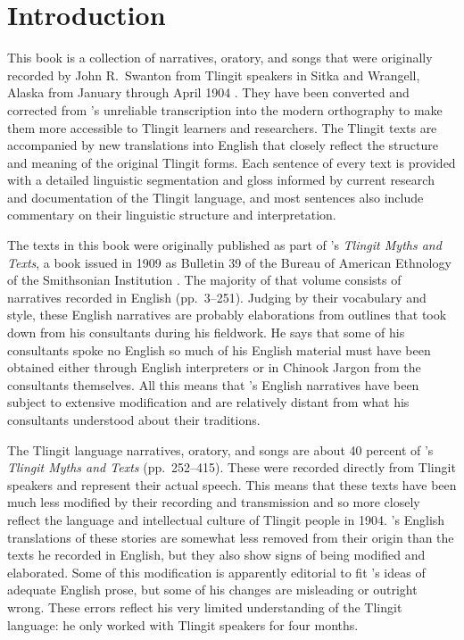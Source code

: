 
\resetexcnt
\chapter{Introduction}\label{ch:introduction}

This book is a collection of narratives, oratory, and songs that were originally recorded by John R.\ Swanton from Tlingit speakers in  Sitka and  Wrangell, Alaska from January through April 1904 \parencite[1]{swanton:1909}.
They have been converted and corrected from \citeauthor{swanton:1909}’s unreliable transcription into the modern orthography to make them more accessible to Tlingit learners and researchers.
The Tlingit texts are accompanied by new translations into English that closely reflect the structure and meaning of the original Tlingit forms.
Each sentence of every text is provided with a detailed linguistic segmentation and gloss informed by current research and documentation of the Tlingit language, and most sentences also include commentary on their linguistic structure and interpretation.

The texts in this book were originally published as part of \citeauthor{swanton:1909}’s \textit{Tlingit Myths and Texts}, a book issued in 1909 as Bulletin 39 of the Bureau of American Ethnology of the Smithsonian Institution \parencite{swanton:1909}.
The majority of that volume consists of narratives recorded in English (pp.\ 3–251).
Judging by their vocabulary and style, these English narratives are probably elaborations from outlines that \citeauthor{swanton:1909} took down from his consultants during his fieldwork.
He says that some of his consultants spoke no English so much of his English material must have been obtained either through English interpreters or in Chinook Jargon from the consultants themselves.
All this means that \citeauthor{swanton:1909}’s English narratives have been subject to extensive modification and are relatively distant from what his consultants understood about their traditions.

The Tlingit language narratives, oratory, and songs are about 40 percent of \citeauthor{swanton:1909}’s \textit{Tlingit Myths and Texts} (pp.\ 252–415).
These were recorded directly from Tlingit speakers and represent their actual speech.
This means that these texts have been much less modified by their recording and transmission and so more closely reflect the language and intellectual culture of Tlingit people in 1904.
\citeauthor{swanton:1909}’s English translations of these stories are somewhat less removed from their origin than the texts he recorded in English, but they also show signs of being modified and elaborated.
Some of this modification is apparently editorial to fit \citeauthor{swanton:1909}’s ideas of adequate English prose, but some of his changes are misleading or outright wrong.
These errors reflect his very limited understanding of the Tlingit language: he only worked with Tlingit speakers for four months.

